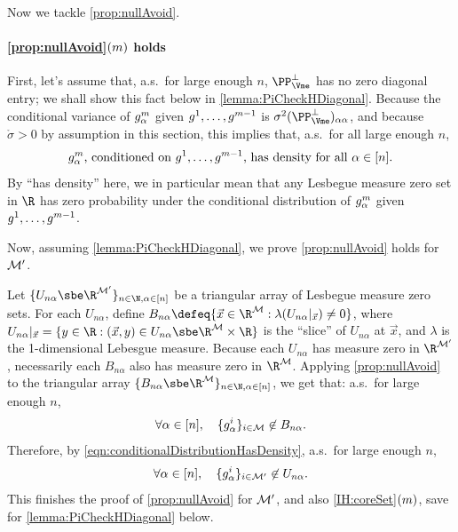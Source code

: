 \documentclass[main.tex]{subfiles}
\begin{document}
Now we tackle \ref{prop:nullAvoid}.

\paragraph{\ref{prop:nullAvoid}$(m)$ holds}

First, let's assume that, a.s.\ for large enough $n$, $\PP_{\Vme}^\perp$ has no zero diagonal entry;
we shall show this fact below in \cref{lemma:PiCheckHDiagonal}.
Because the conditional variance of $g^m_\alpha$ given $g^1, \ldots, g^{m-1}$ is $\sigma^2 (\PP_{\Vme}^\perp)_{\alpha\alpha}$, and because $\mathring \sigma > 0$ by assumption in this section, this implies that, a.s.\ for all large enough $n$,
\begin{equation}
\text{$g^m_\alpha$, conditioned on $g^1, \ldots, g^{m-1}$, has density for all $\alpha \in [n]$.}
\label{eqn:conditionalDistributionHasDensity}
\end{equation}
By ``has density'' here, we in particular mean that any Lesbegue measure zero set in $\R$ has zero probability under the conditional distribution of $g^m_\alpha$ given $g^1, \ldots, g^{m-1}$.

Now, assuming \cref{lemma:PiCheckHDiagonal}, we prove \ref{prop:nullAvoid} holds for $\mathcal{M}'$.

Let $\{U_{n\alpha} \sbe \R^{\coreset'}\}_{n\in\N, \alpha \in [n]}$ be a triangular array of Lesbegue measure zero sets.
For each $U_{n\alpha}$, define $B_{n\alpha} \defeq \{\vec x \in \R^{\coreset}: \lambda(U_{n\alpha}|_{\vec x}) \ne 0\}$, where $U_{n\alpha}|_{\vec x} = \{y \in \R: (\vec x, y) \in U_{n\alpha} \sbe \R^{\coreset} \times \R\}$ is the ``slice'' of $U_{n\alpha}$ at $\vec x$, and $\lambda$ is the 1-dimensional Lebesgue measure.
Because each $U_{n\alpha}$ has measure zero in $\R^{\coreset'}$, necessarily each $B_{n\alpha}$ also has measure zero in $\R^{\coreset}$.
Applying \ref{prop:nullAvoid} to the triangular array $\{B_{n\alpha} \sbe \R^{\coreset}\}_{n \in \N, \alpha \in [n]}$, we get that: a.s.\ for large enough $n$,
\[
\forall \alpha \in [n],\quad \{g^i_\alpha\}_{i \in \mathcal{M}} \not \in B_{n\alpha}.\]
Therefore, by \cref{eqn:conditionalDistributionHasDensity}, a.s.\ for large enough $n$,
\[
\forall \alpha \in [n],\quad \{g^i_\alpha\}_{i \in \mathcal{M}'} \not \in U_{n\alpha}.
\]
This finishes the proof of \ref{prop:nullAvoid} for $\mathcal{M}'$, and also \ref{IH:coreSet}$(m)$, save for \cref{lemma:PiCheckHDiagonal} below.
\end{document}
